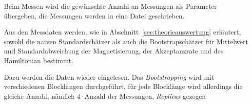 	Beim Messen wird die gewünschte Anzahl an Messungen als Parameter übergeben, die Messungen werden in eine Datei geschrieben.
	
	Aus den Messdaten werden, wie in Abschnitt~\ref{sec:theorieauswertung} erläutert, sowohl die naiven Standardschätzer als auch die Bootstrapschätzer für Mittelwert und Standardabweichung der Magnetisierung, der Akzeptanzrate und des Hamiltonian bestimmt.
	
	Dazu werden die Daten wieder eingelesen. Das \textit{Bootstrapping} wird mit verschiedenen Blocklängen durchgeführt, für jede Blocklänge wird allerdings die gleiche Anzahl, nämlich $4\cdot\text{Anzahl der Messungen}$, \textit{Replicas} gezogen
	
	
	
	
	
	
	

